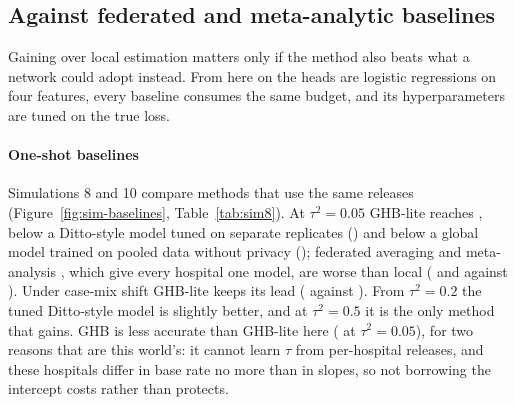 \subsection{Against federated and meta-analytic baselines}\label{sec:sim-baselines}

Gaining over local estimation matters only if the method also beats what a network could adopt instead. From here on the heads are logistic regressions on four features, every baseline consumes the same budget, and its hyperparameters are tuned on the true loss.

\paragraph{One-shot baselines} Simulations 8 and 10 compare methods that use the same releases (Figure~\ref{fig:sim-baselines}, Table~\ref{tab:sim8}). At $\tau^2=0.05$ GHB-lite reaches \SimEightMidGHB, below a Ditto-style \cite{li2021ditto} model tuned on separate replicates (\SimEightMidDitto) and below a global model trained on pooled data without privacy (\SimEightMidPooled); federated averaging \cite{mcmahan2017communication} and meta-analysis \cite{dersimonian1986meta}, which give every hospital one model, are worse than local (\SimEightMidFedavg{} and \SimEightMidMeta{} against \SimEightMidLocal). Under case-mix shift GHB-lite keeps its lead (\SimEightShiftGHB{} against \SimEightShiftDitto). From $\tau^2=0.2$ the tuned Ditto-style model is slightly better, and at $\tau^2=0.5$ it is the only method that gains. GHB is less accurate than GHB-lite here (\SimEightMidV{} at $\tau^2=0.05$), for two reasons that are this world's: it cannot learn $\tau$ from per-hospital releases, and these hospitals differ in base rate no more than in slopes, so not borrowing the intercept costs rather than protects.

